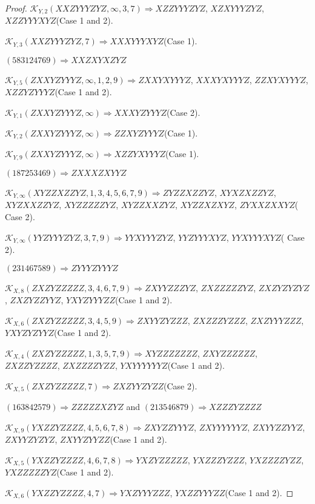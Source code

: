 \documentclass[12pt]{article}
\theoremstyle{plain}
\theoremstyle{definition}
\theoremstyle{remark}
\newcommand{\fancy}[1]{\mathcal{#1}}
\def\K{\fancy{K}}
\begin{document}
\begin{proof}
	$\K_{Y,2}(XXZYYYZYZ,\infty,3, 7)\Rightarrow $$XZZYYYZYZ$, $XZXYYYZYZ$, $XZZYYYXYZ$(Case 1 and 2).
	
	$\K_{Y,3}(XXZYYYZYZ,7)\Rightarrow $$XXXYYYXYZ$(Case 1).
	
	
	
	$(5 8 3 1 2 4 7 6 9)\Rightarrow XXZXYXZYZ$
	
	
	$\K_{Y,5}(ZXXYZYYYZ,\infty,1, 2, 9)\Rightarrow $$ZXXYXYYYZ$, $XXXYXYYYZ$, $ZZXYXYYYZ$, $XZZYZYYYZ$(Case 1 and 2).
	
	$\K_{Y,1}(ZXXYZYYYZ,\infty)\Rightarrow $$XXXYZYYYZ$(Case 2).
	
	$\K_{Y,2}(ZXXYZYYYZ,\infty)\Rightarrow $$ZZXYZYYYZ$(Case 1).
	
	$\K_{Y,9}(ZXXYZYYYZ,\infty)\Rightarrow $$XZZYXYYYZ$(Case 1).
	
	
	
	$(1 8 7 2 5 3 4 6 9)\Rightarrow ZXXXZXYYZ$
	
	
	$\K_{Y,\infty}(XYZZXZZYZ,1, 3, 4, 5, 6, 7, 9)\Rightarrow $$ZYZZXZZYZ$, $XYXZXZZYZ$, $XYZXXZZYZ$, $XYZZZZZYZ$, $XYZZXXZYZ$, $XYZZXZXYZ$, $ZYXXZXXYZ$( Case 2).
	
	$\K_{Y,\infty}(YYZYYYZYZ,3, 7, 9)\Rightarrow $$YYXYYYZYZ$, $YYZYYYXYZ$, $YYXYYYXYZ$( Case 2).
	
	
	
	$(2 3 1 4 6 7 5 8 9)\Rightarrow ZYYYZYYYZ$
	
	
	$\K_{X,8}(ZXZYZZZZZ,3, 4, 6, 7, 9)\Rightarrow $$ZXYYZZZYZ$, $ZXZZZZZYZ$, $ZXZYZYZYZ$, $ZXZYZZYYZ$, $YXYZYYYZZ$(Case 1 and 2).
	
	$\K_{X,6}(ZXZYZZZZZ,3, 4, 5, 9)\Rightarrow $$ZXYYZYZZZ$, $ZXZZZYZZZ$, $ZXZYYYZZZ$, $YXYZYZYYZ$(Case 1 and 2).
	
	$\K_{X,4}(ZXZYZZZZZ,1, 3, 5, 7, 9)\Rightarrow $$XYZZZZZZZ$, $ZXYZZZZZZ$, $ZXZZYZZZZ$, $ZXZZZZYZZ$, $YXYYYYYYZ$(Case 1 and 2).
	
	$\K_{X,5}(ZXZYZZZZZ,7)\Rightarrow $$ZXZYYZYZZ$(Case 2).
	
	
	
	$(1 6 3 8 4 2 5 7 9)\Rightarrow ZZZZZXZYZ$ and $(2 1 3 5 4 6 8 7 9)\Rightarrow XZZZYZZZZ$
	
	
	$\K_{X,9}(YXZZYZZZZ,4, 5, 6, 7, 8)\Rightarrow $$ZXYZZYYYZ$, $ZXYYYYYYZ$, $ZXYYZZYYZ$, $ZXYYZYZYZ$, $ZXYYZYYZZ$(Case 1 and 2).
	
	$\K_{X,5}(YXZZYZZZZ,4, 6, 7, 8)\Rightarrow $$YXZYZZZZZ$, $YXZZZYZZZ$, $YXZZZZYZZ$, $YXZZZZZYZ$(Case 1 and 2).
	
	$\K_{X,6}(YXZZYZZZZ,4, 7)\Rightarrow $$YXZYYYZZZ$, $YXZZYYYZZ$(Case 1 and 2).
	

\end{proof}
\end{document}
